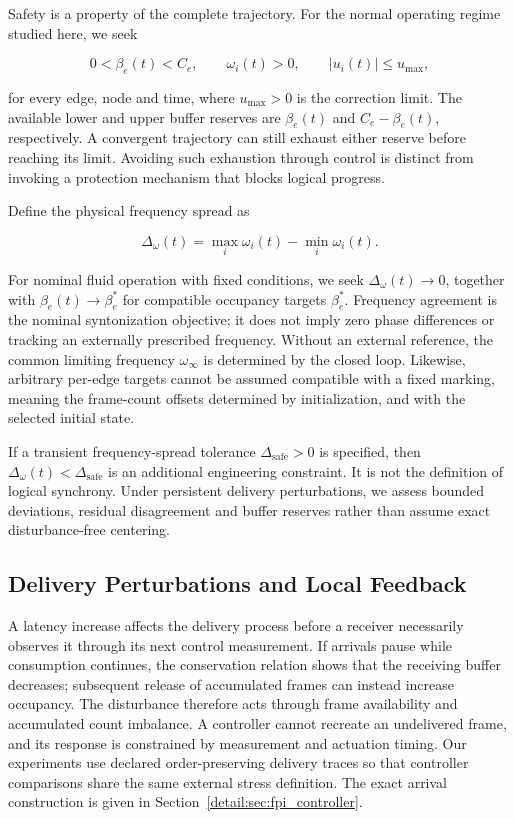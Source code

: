 Safety is a property of the complete trajectory. For the normal operating regime studied here, we seek

\begin{equation}
0<\beta_e(t)<C_e,\qquad
\omega_i(t)>0,\qquad |u_i(t)|\le u_{\max},
\end{equation}

for every edge, node and time, where $u_{\max}>0$ is the correction limit. The available lower and upper buffer reserves are $\beta_e(t)$ and $C_e-\beta_e(t)$, respectively. A convergent trajectory can still exhaust either reserve before reaching its limit. Avoiding such exhaustion through control is distinct from invoking a protection mechanism that blocks logical progress.

Define the physical frequency spread as

\begin{equation}
\Delta_\omega(t)=\max_i\omega_i(t)-\min_i\omega_i(t).
\end{equation}

For nominal fluid operation with fixed conditions, we seek $\Delta_\omega(t)\to0$, together with $\beta_e(t)\to\beta_e^*$ for compatible occupancy targets $\beta_e^*$. Frequency agreement is the nominal syntonization objective; it does not imply zero phase differences or tracking an externally prescribed frequency. Without an external reference, the common limiting frequency $\omega_\infty$ is determined by the closed loop. Likewise, arbitrary per-edge targets cannot be assumed compatible with a fixed marking, meaning the frame-count offsets determined by initialization, and with the selected initial state.

If a transient frequency-spread tolerance $\Delta_{\mathrm{safe}}>0$ is specified, then $\Delta_\omega(t)<\Delta_{\mathrm{safe}}$ is an additional engineering constraint. It is not the definition of logical synchrony. Under persistent delivery perturbations, we assess bounded deviations, residual disagreement and buffer reserves rather than assume exact disturbance-free centering.

\subsection{Delivery Perturbations and Local Feedback}

A latency increase affects the delivery process before a receiver necessarily observes it through its next control measurement. If arrivals pause while consumption continues, the conservation relation shows that the receiving buffer decreases; subsequent release of accumulated frames can instead increase occupancy. The disturbance therefore acts through frame availability and accumulated count imbalance. A controller cannot recreate an undelivered frame, and its response is constrained by measurement and actuation timing. Our experiments use declared order-preserving delivery traces so that controller comparisons share the same external stress definition. The exact arrival construction is given in Section~\ref{detail:sec:fpi_controller}.

